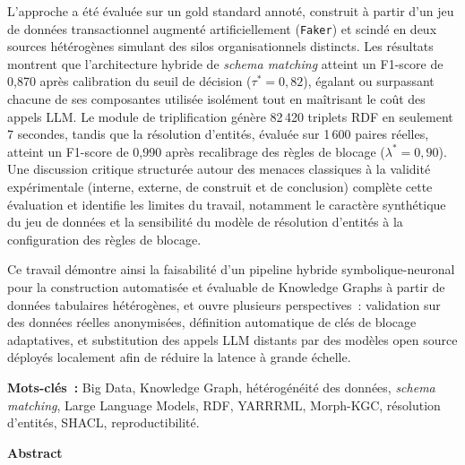 L'approche a été évaluée sur un gold standard annoté, construit à
partir d'un jeu de données transactionnel augmenté artificiellement
(\texttt{Faker}) et scindé en deux sources hétérogènes simulant des
silos organisationnels distincts. Les résultats montrent que
l'architecture hybride de \textit{schema matching} atteint un
F1-score de 0,870 après calibration du seuil de décision
($\tau^{*} = 0{,}82$), égalant ou surpassant chacune de ses
composantes utilisée isolément tout en maîtrisant le coût des appels
LLM. Le module de triplification génère 82\,420 triplets RDF en
seulement 7 secondes, tandis que la résolution d'entités, évaluée sur
1\,600 paires réelles, atteint un F1-score de 0,990 après recalibrage
des règles de blocage ($\lambda^{*} = 0{,}90$). Une discussion
critique structurée autour des menaces classiques à la validité
expérimentale (interne, externe, de construit et de conclusion)
complète cette évaluation et identifie les limites du travail,
notamment le caractère synthétique du jeu de données et la
sensibilité du modèle de résolution d'entités à la configuration des
règles de blocage.

Ce travail démontre ainsi la faisabilité d'un pipeline hybride
symbolique-neuronal pour la construction automatisée et évaluable de
Knowledge Graphs à partir de données tabulaires hétérogènes, et ouvre
plusieurs perspectives~: validation sur des données réelles
anonymisées, définition automatique de clés de blocage adaptatives,
et substitution des appels LLM distants par des modèles open source
déployés localement afin de réduire la latence à grande échelle.

\vspace{0.8cm}
\noindent\textbf{Mots-clés~:} Big Data, Knowledge Graph, hétérogénéité
des données, \textit{schema matching}, Large Language Models,
RDF, YARRRML, Morph-KGC, résolution d'entités, SHACL, reproductibilité.

\newpage


\begin{center}
    \vspace*{-1cm} %
    {\Huge\bfseries Abstract}
    \vspace{0.5cm}
\end{center}

